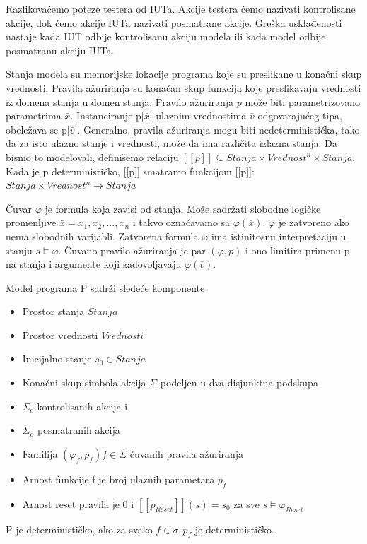 \documentclass[a4paper]{article}
\theoremstyle{definition}
\begin{document}
{Razlikovaćemo poteze testera od IUTa. Akcije testera ćemo nazivati kontrolisane akcije, dok ćemo akcije IUTa nazivati posmatrane akcije. Greška usklađenosti nastaje kada IUT odbije kontrolisanu akciju modela ili kada model odbije posmatranu akciju IUTa.

Stanja modela su memorijske lokacije programa koje su preslikane u konačni skup vrednosti. 
Pravila ažuriranja su konačan skup funkcija koje preslikavaju vrednosti iz domena stanja u domen stanja. Pravilo ažuriranja $p$ može biti parametrizovano parametrima $\bar{x}$.
Instanciranje p[$\bar{x}$] ulaznim vrednostima $\bar{v}$ odgovarajućeg tipa, obeležava se p[$\bar{v}$].
Generalno, pravila ažuriranja mogu biti nedeterministička, tako da za isto ulazno stanje i vrednosti, može da ima različita izlazna stanja. Da bismo to modelovali, definišemo relaciju $[[p]] \subseteq Stanja \times Vrednost^n \times Stanja$.
Kada je p determinističko, [[p]] smatramo funkcijom [[p]]: $Stanja \times Vrednost^n  \rightarrow Stanja$

Čuvar $\varphi$ je formula koja zavisi od stanja. Može sadržati slobodne logičke promenljive $\bar{x} = x_1, x_2,..., x_n$ i takvo označavamo sa $\varphi(\bar{x})$. $\varphi$ je zatvoreno ako nema slobodnih varijabli. Zatvorena formula $\varphi$ ima istinitosnu interpretaciju u stanju $s \models \varphi$. Čuvano pravilo ažuriranja je par $(\varphi, p)$ i ono limitira primenu p na stanja i argumente koji zadovoljavaju $\varphi(\bar{v})$.

Model programa P sadrži sledeće komponente
\begin{itemize}
\item Prostor stanja $Stanja$
\item Prostor vrednosti $Vrednosti$
\item Inicijalno stanje $s_0 \in Stanja$
\item Konačni skup simbola akcija $\Sigma$ podeljen u dva disjunktna podskupa
	\item $\Sigma_c$ kontrolisanih akcija i
	\item $\Sigma_o$ posmatranih akcija
\item Familija $(\varphi_f, p_f) f \in \Sigma$ čuvanih pravila ažuriranja
	\item Arnost funkcije f je broj ulaznih parametara $p_f$
	\item Arnost reset pravila je 0 i $[[p_{Reset}]](s) = s_0$ za sve $s \models \varphi_{Reset}$
\end{itemize}
P je determinističko, ako za svako $f \in \sigma, p_f$ je determinističko. \\

}
\end{document}
